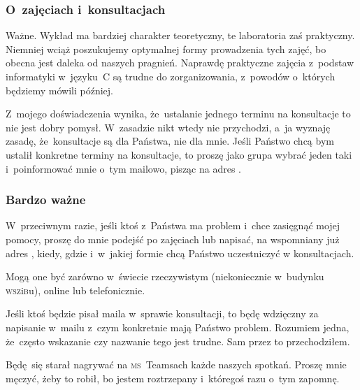 \documentclass[10pt,t]{beamer}
\begin{document}
\begin{frame}
  \frametitle{O~zajęciach i~konsultacjach}


  \alert{Ważne.} Wykład ma bardziej charakter teoretyczny, te laboratoria
  zaś praktyczny. Niemniej wciąż poszukujemy optymalnej formy prowadzenia
  tych zajęć, bo obecna jest daleka od naszych pragnień. Naprawdę
  praktyczne zajęcia z~podstaw informatyki w~języku~C są trudne do
  zorganizowania, z~powodów o~których będziemy mówili później.

  Z~mojego doświadczenia wynika, że~ustalanie jednego terminu na konsultacje
  to nie jest dobry pomysł. W~zasadzie nikt wtedy nie przychodzi, a~ja
  wyznaję zasadę, że~konsultacje są dla Państwa, nie dla mnie. Jeśli
  Państwo chcą bym ustalił konkretne terminy na konsultacje, to proszę jako
  grupa wybrać jeden taki i~poinformować mnie o~tym mailowo, pisząc na
  adres \email.

\end{frame}





\begin{frame}
  \frametitle{Bardzo ważne}


  W~przeciwnym razie, jeśli ktoś z~Państwa ma problem i~chce zasięgnąć
  mojej pomocy, proszę do mnie podejść po zajęciach lub napisać, na
  wspomniany już adres \email, kiedy, gdzie i~w~jakiej formie chcą Państwo
  uczestniczyć w konsultacjach.

  Mogą one być zarówno w~świecie rzeczywistym (niekoniecznie w~budynku
  \textsc{wsz}i\textsc{b}u), online lub telefonicznie.

  Jeśli ktoś będzie pisał maila w~sprawie konsultacji, to będę wdzięczny za
  napisanie w~mailu z~czym konkretnie mają Państwo problem. Rozumiem jedna,
  że~często wskazanie czy nazwanie tego jest trudne. Sam przez to
  przechodziłem.

  Będę~się starał nagrywać na \textsc{ms}~Teamsach każde naszych spotkań.
  Proszę mnie męczyć, żeby to robił, bo jestem roztrzepany i~któregoś
  razu o~tym zapomnę.

\end{frame}
\end{document}
